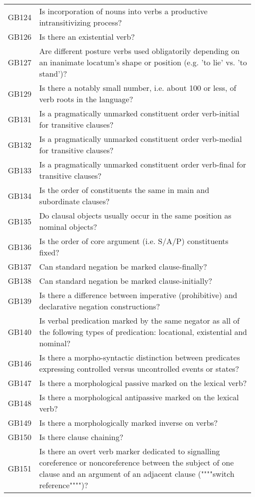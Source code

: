 \begin{longtable}{p{3cm}p{12cm}}
  GB124 & Is incorporation of nouns into verbs a productive intransitivizing process? \\ 
  GB126 & Is there an existential verb? \\ 
  GB127 & Are different posture verbs used obligatorily depending on an inanimate locatum's shape or position (e.g. 'to lie' vs. 'to stand')? \\ 
  GB129 & Is there a notably small number, i.e. about 100 or less, of verb roots in the language? \\ 
  GB131 & Is a pragmatically unmarked constituent order verb-initial for transitive clauses? \\ 
  GB132 & Is a pragmatically unmarked constituent order verb-medial for transitive clauses? \\ 
  GB133 & Is a pragmatically unmarked constituent order verb-final for transitive clauses? \\ 
  GB134 & Is the order of constituents the same in main and subordinate clauses? \\ 
  GB135 & Do clausal objects usually occur in the same position as nominal objects? \\ 
  GB136 & Is the order of core argument (i.e. S/A/P) constituents fixed? \\ 
  GB137 & Can standard negation be marked clause-finally? \\ 
  GB138 & Can standard negation be marked clause-initially? \\ 
  GB139 & Is there a difference between imperative (prohibitive) and declarative negation constructions? \\ 
  GB140 & Is verbal predication marked by the same negator as all of the following types of predication: locational, existential and nominal? \\ 
  GB146 & Is there a morpho-syntactic distinction between predicates expressing controlled versus uncontrolled events or states? \\ 
  GB147 & Is there a morphological passive marked on the lexical verb? \\ 
  GB148 & Is there a morphological antipassive marked on the lexical verb? \\ 
  GB149 & Is there a morphologically marked inverse on verbs? \\ 
  GB150 & Is there clause chaining? \\ 
  GB151 & Is there an overt verb marker dedicated to signalling coreference or noncoreference between the subject of one clause and an argument of an adjacent clause (""""switch reference"""")? \\ 

\end{longtable}
